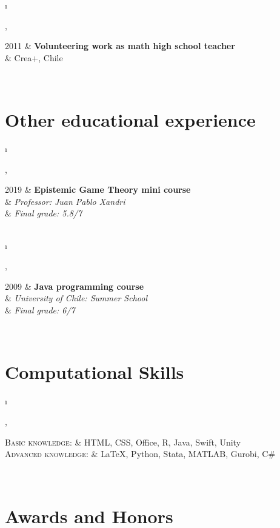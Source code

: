 \documentclass[a4paper, 10pt]{article}
\newcommand{\tablength}{}
\newcommand{\setTabParams}[1]{\renewcommand\tablength{}\forcsvlist{\listadd\tablength}{#1}}
\newcommand{\setCols}[1]{			%
	\ifnum0=\i						%
		\ifdim0cm=#1				%
			\def \firstCol {r}		%
		\else						%
			\def \firstCol {p{#1}}	%
		\fi							%
	\else \ifnum1=\i				%
		\ifdim0cm=#1				%
			\def \secondCol {l}		%
		\else						%
			\def \secondCol{p{#1}}	%
		\fi							%
	\else \ifnum2=\i				%
		\ifnum0=#1					%
			\def \sep {}			%
		\else						%
			\def \sep {|}			%
		\fi							%
	\fi \fi \fi						%
	\advance\i by1					%
}
\newcommand{\tab}[1]{							%
	\newcount\i									%
	\forlistloop{\setCols}{\tablength}			%
	\begin{tabular}{\firstCol \sep \secondCol}	%
		#1										%
	\end{tabular} \\[.5ex]						%
}
\begin{document}
\tab{
\textsc{\hspace{4.7ex} 2011}
	&	\textbf{Volunteering work as math high school teacher}	\\[0.2ex]
	&	Crea+, Chile
}

\section{Other educational experience}
\setTabParams{0cm,11cm,0}

\tab{
\textsc{2019}
 	&	\textbf{Epistemic Game Theory mini course }	\\[0.2ex]
	&	\emph{\quad Professor: Juan Pablo Xandri}		\\[0.2ex]
	&	\emph{\quad Final grade: 5.8/7}
}

\tab{
\textsc{2009}
 	&	\textbf{Java programming course}	\\[0.2ex]
	&	\emph{\quad University of Chile: Summer School}		\\[0.2ex]
	&	\emph{\quad Final grade: 6/7}
}

\section{Computational Skills}
\setTabParams{0cm,0cm,0}

\tab{
\textsc{Basic knowledge:}
	&	HTML, CSS, Office, R, Java, Swift, Unity 	\\[0.5ex]

\textsc{Advanced knowledge:}
	&	{\LaTeX}, Python, Stata, MATLAB, Gurobi, C\#	\\
}

\section{Awards and Honors}
\setTabParams{0cm,11cm,0}
\end{document}
